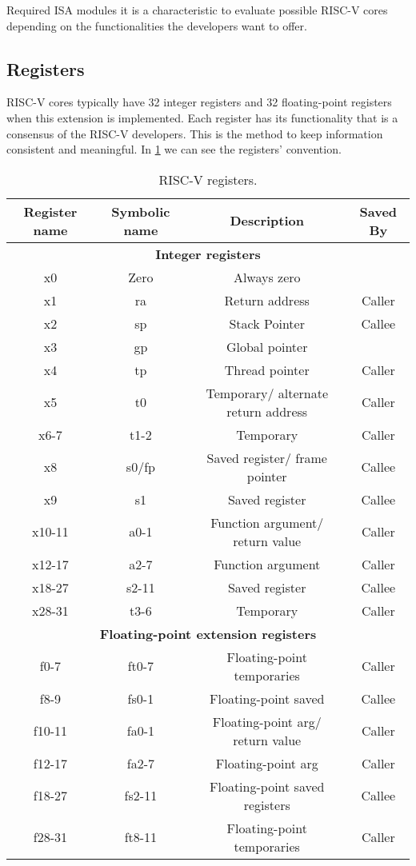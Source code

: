 Required ISA modules it is a characteristic to evaluate possible RISC-V cores depending on the functionalities the developers want to offer.

\subsection{Registers}
RISC-V cores typically have 32 integer registers and 32 floating-point registers when this extension is implemented. Each register has its functionality that is a consensus of the RISC-V developers. This is the method to keep information consistent and meaningful. In \ref{tab:riscreg} we can see the registers' convention.


\begin{table}[H]
\centering
\begin{tabular}{|c|c|c|c|}
\hline
\textbf{Register name} & \textbf{Symbolic name} & \textbf{Description}  & \textbf{Saved By}  \\ \hline
\multicolumn{4}{|c|}{\textbf{Integer registers}} \\ \hline
x0 & Zero & Always zero & \\ \hline
x1 & ra & Return address & Caller \\ \hline
x2 & sp & Stack Pointer & Callee \\ \hline
x3 & gp & Global pointer &  \\ \hline
x4 & tp & Thread pointer & Caller \\ \hline
x5 & t0 & Temporary/ alternate return address & Caller \\ \hline
x6-7 & t1-2  & Temporary & Caller \\ \hline
x8 & s0/fp & Saved register/ frame pointer & Callee \\ \hline
x9 & s1 & Saved register & Callee \\ \hline
x10-11 & a0-1 & Function argument/ return value & Caller \\ \hline
x12-17 & a2-7 & Function argument & Caller \\ \hline
x18-27 & s2-11 & Saved register & Callee \\ \hline
x28-31 & t3-6 & Temporary & Caller \\ \hline
\multicolumn{4}{|c|}{\textbf{Floating-point extension registers}} \\ \hline
f0-7 & ft0-7 & Floating-point temporaries & Caller \\ \hline
f8-9 & fs0-1 & Floating-point saved & Callee \\ \hline
f10-11 & fa0-1 & Floating-point arg/ return value & Caller \\ \hline
f12-17 & fa2-7 & Floating-point arg & Caller \\ \hline
f18-27 & fs2-11 & Floating-point saved registers & Callee \\ \hline
f28-31 & ft8-11 & Floating-point temporaries & Caller \\ \hline
\end{tabular}
\caption{RISC-V registers.} 
\label{tab:riscreg}
\end{table}


